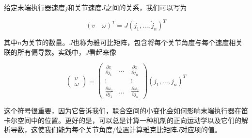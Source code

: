 
给定末端执行器速度$\dot{j}$和关节速度$J$之间的关系，我们可以写为

\begin{equation}
 (v \quad \omega)^T=J(\dot{j}_1,\ldots,\dot{j}_n)^T
\end{equation}


其中$n$为关节的数量。$J$也称为雅可比矩阵，包含将每个关节角度与每个速度相关联的所有偏导数。实践中，$J$看起来像

\begin{equation}
\left(\begin{array}{c}v\\\omega\end{array}\right)=\left(\begin{array}{ccc}\frac{\partial{x}}{\partial{j_1}} & \ldots & \frac{\partial{x}}{\partial{j_n}}\\\vdots & \quad & \vdots\\\frac{\partial{\omega_z}}{\partial{j_1}} & \ldots & \frac{\partial{\omega_z}}{\partial{j_n}}\end{array}\right)(j_1,\ldots,j_n)^T
\end{equation}


这个符号很重要，因为它告诉我们，联合空间的小变化会如何影响末端执行器在笛卡尔空间中的位置。更好的是，可以总是计算一种机制的正向运动学以及它们的解析导数，这使我们能为每个关节角度/位置计算雅克比矩阵$J$对应项的值。


